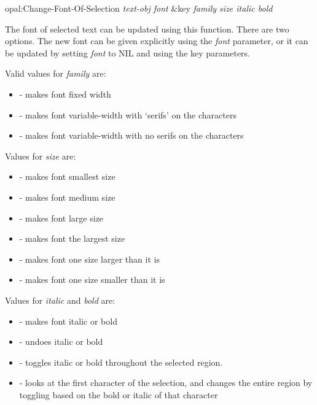 \begin{programexample}
opal:Change-Font-Of-Selection {\it text-obj  font} \&key {\it family size italic bold}\value{function}
\end{programexample}

The font of selected text can be updated using this function.  There are two
options.  The new font can be given explicitly using the {\it font} parameter,
or it can be updated by setting {\it font} to {\sc NIL} and using the key
parameters.

Valid values for {\it family} are:
\begin{itemize}
\item {} - makes font fixed width

\item {} - makes font variable-width with `serifs' on the characters

\item {} - makes font variable-width with no serifs on the characters
\end{itemize}

Values for {\it size} are:
\begin{itemize}
\item {} - makes font smallest size

\item {} - makes font medium size

\item {} - makes font large size

\item {} - makes font the largest size

\item {} - makes font one size larger than it is

\item {} - makes font one size smaller than it is
\end{itemize}

Values for {\it italic} and {\it bold} are:
\begin{itemize}
\item {} - makes font italic or bold

\item {} - undoes italic or bold

\item {} - toggles italic or bold throughout the selected region.

\item {} - looks at the first character of the selection,
and changes the entire region by toggling based on the bold or italic
of that character
\end{itemize}

